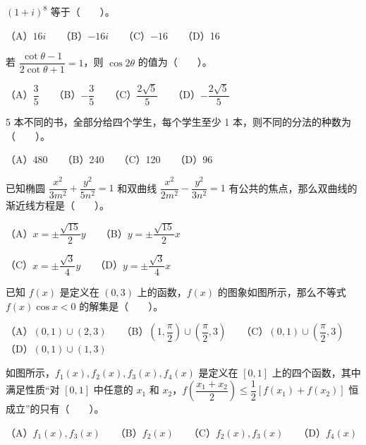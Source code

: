 \begin{question}
\((1+i)^8\) 等于\mbox{（　　）}。

（A）\(16i\)　　（B）\(-16i\)　　（C）\(-16\)　　（D）16

\end{question}
\begin{question}
若 \(\dfrac{\cot\theta-1}{2\cot\theta+1}=1\)，则 \(\cos2\theta\) 的值为\mbox{（　　）}。

（A）\(\dfrac{3}{5}\)　　（B）\(-\dfrac{3}{5}\)　　（C）\(\dfrac{2\sqrt5}{5}\)　　（D）\(-\dfrac{2\sqrt5}{5}\)

\end{question}
\begin{question}
5 本不同的书，全部分给四个学生，每个学生至少 1 本，则不同的分法的种数为\mbox{（　　）}。

（A）480　　（B）240　　（C）120　　（D）96

\end{question}
\begin{question}
已知椭圆 \(\dfrac{x^2}{3m^2}+\dfrac{y^2}{5n^2}=1\) 和双曲线 \(\dfrac{x^2}{2m^2}-\dfrac{y^2}{3n^2}=1\) 有公共的焦点，那么双曲线的渐近线方程是\mbox{（　　）}。

（A）\(x=\pm\dfrac{\sqrt{15}}2y\)　　（B）\(y=\pm\dfrac{\sqrt{15}}2x\)

（C）\(x=\pm\dfrac{\sqrt3}{4}y\)　　（D）\(y=\pm\dfrac{\sqrt3}{4}x\)

\Needspace{0.4\textheight}
\end{question}
\begin{question}
已知 \(f(x)\) 是定义在 \((0,3)\) 上的函数，\(f(x)\) 的图象如图所示，那么不等式 \(f(x)\cos x<0\) 的解集是\mbox{（　　）}。
\nopagebreak[4]
\begin{center}\end{center}
\nopagebreak[4]
（A）\((0,1)\cup(2,3)\)　　（B）\((1,\dfrac\pi2)\cup(\dfrac\pi2,3)\)　　（C）\((0,1)\cup(\dfrac\pi2,3)\)　　（D）\((0,1)\cup(1,3)\)

\Needspace{0.4\textheight}
\end{question}
\begin{question}
如图所示，\(f_1(x),f_2(x),f_3(x),f_4(x)\) 是定义在 \([0,1]\) 上的四个函数，其中满足性质“对 \([0,1]\) 中任意的 \(x_1\) 和 \(x_2\)，\(f\left(\dfrac{x_1+x_2}{2}\right)\leqslant\dfrac12[f(x_1)+f(x_2)]\) 恒成立”的只有\mbox{（　　）}。
\nopagebreak[4]
\begin{center}\end{center}
\nopagebreak[4]
（A）\(f_1(x),f_3(x)\)　　（B）\(f_2(x)\)　　（C）\(f_2(x),f_3(x)\)　　（D）\(f_4(x)\)

\end{question}

